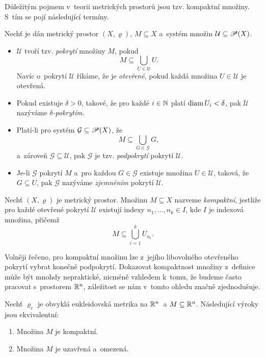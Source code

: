 Důležitým pojmem v~teorii metrických prostorů jsou tzv. kompaktní množiny. S~tím se pojí následující termíny.
\begin{definition}\label{def:delta-pokryti-zjemneni}
    Nechť je dán metrický prostor $(X,\varrho)$, $M\subseteq X$ a~systém množin $\mathcal{U}\subseteq\mathscr{P}(X)$.
    \begin{itemize}
        \item $\mathcal{U}$ tvoří tzv. \emph{pokrytí} množiny $M$, pokud
        \[M\subseteq\bigcup_{U\in\mathcal{U}} U.\]
        Navíc o~pokrytí $\mathcal{U}$ říkáme, že je \emph{otevřené}, pokud každá množina $U\in\mathcal{U}$ je otevřená.
        \item Pokud existuje $\delta>0$, takové, že pro každé $i\in\mathbb{N}$ platí $\operatorname{diam}{U_i}<\delta$, pak $\mathcal{U}$ nazýváme \emph{$\delta$-pokrytím}.
        \item Platí-li pro systém $\mathcal{G}\subseteq\mathscr{P}(X)$, že
        \[M\subseteq\bigcup_{G\in\mathcal{G}} G,\]
        a~zároveň $\mathcal{G}\subseteq\mathcal{U}$, pak $\mathcal{G}$ je tzv. \emph{podpokrytí} pokrytí $\mathcal{U}$.
        \item Je-li $\mathcal{G}$ pokrytí $M$ a~pro každou $G\in\mathcal{G}$ existuje množina $U\in\mathcal{U}$, taková, že $G\subseteq U$, pak $\mathcal{G}$ nazýváme \emph{zjemněním} pokrytí $\mathcal{U}$. 
    \end{itemize}
\end{definition}
\begin{definition}\label{def:kompaktni-mnozina}
    Nechť $(X,\varrho)$ je metrický prostor. Množinu $M\subseteq X$ nazveme \emph{kompaktní}, jestliže pro každé otevřené pokrytí $\mathcal{U}$ existují indexy $n_1,\ldots,n_k\in I$, kde $I$ je indexová množina, přičemž
    \[M\subseteq\bigcup_{i=1}^k U_{n_i}.\]
\end{definition}
Volněji řečeno, pro kompaktní množinu lze z~jejího libovolného otevřeného pokrytí vybrat konečné podpokrytí. Dokazovat kompaktnost množiny z~definice může být mnohdy nepraktické, nicméně vzhledem k~tomu, že budeme často pracovat s~prostorem $\mathbb{R}^n$, záležitost se nám v~tomto ohledu značně zjednodušuje.
\begin{theorem}\label{thm:heine-borel}
    Nechť $\varrho_e$ je obvyklá eukleidovská metrika na $\mathbb{R}^n$~a $M\subseteq\mathbb{R}^n$. Následující výroky jsou ekvivalentní:
    \begin{enumerate}[label=(\roman*)]
        \item Množina $M$ je kompaktní.
        \item Množina $M$ je uzavřená a~omezená.
    \end{enumerate}
\end{theorem}

